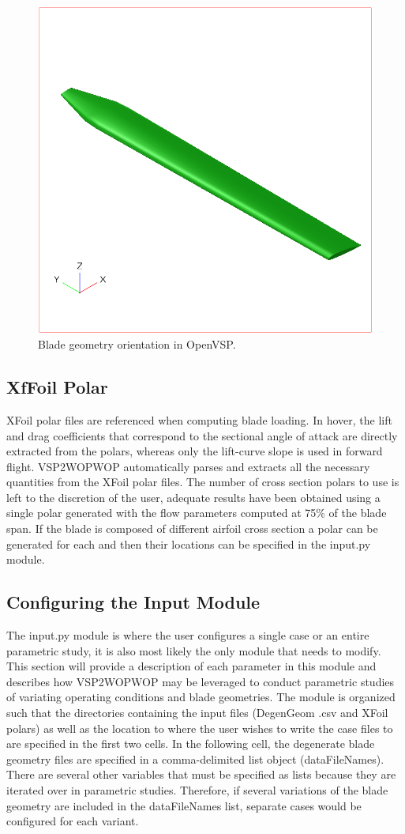 \documentclass[journal ]{new-aiaa}
\begin{document}
\begin{figure}[hbt!]
\centering
\includegraphics[width=.5\textwidth]{Figures/blade_orientation.png}
\caption{\label{fig:blade_orientation}Blade geometry orientation in OpenVSP.}
\end{figure}

\subsection{XfFoil Polar}

XFoil polar files are referenced when computing blade loading. In hover, the lift and drag coefficients that correspond to the sectional angle of attack are directly extracted from the polars, whereas only the lift-curve slope is used in forward flight. VSP2WOPWOP automatically parses and extracts all the necessary quantities from the XFoil polar files. The number of cross section polars to use is left to the discretion of the user, adequate results have been obtained using a single polar generated with the flow parameters computed at 75\% of the blade span. If the blade is composed of different airfoil cross section a polar can be generated for each and then their locations can be specified in the input.py module. 


\subsection{Configuring the Input Module}

The input.py module is where the user configures a single case or an entire parametric study, it is also most likely the only module that needs to modify. This section will provide a description of each parameter in this module and describes how VSP2WOPWOP may be leveraged to conduct parametric studies of variating operating conditions and blade geometries. The module is organized such that the directories containing the input files (DegenGeom .csv and XFoil polars) as well as the location to where the user wishes to write the case files to are specified in the first two cells. In the following cell, the degenerate blade geometry files are specified in a comma-delimited list object (dataFileNames). There are several other variables that must be specified as lists because they are iterated over in parametric studies. Therefore, if several variations of the blade geometry are included in the dataFileNames list, separate cases would be configured for each variant. 
\end{document}
